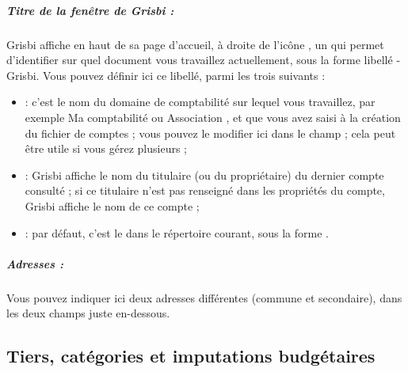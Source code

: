 \subparagraph{Titre de la fenêtre de Grisbi :\label{setup-display-addresses-titles}}

Grisbi affiche en haut de sa page d'accueil, à droite de l'icône , un  qui permet d'identifier sur quel document vous travaillez actuellement, sous la forme \og libellé - Grisbi\fg{}. Vous pouvez définir ici ce libellé, parmi les trois suivants :

\begin{itemize}
	\item {} : c'est le nom du domaine de comptabilité sur lequel vous travaillez, par exemple \og Ma comptabilité \fg{} ou \og Association \fg{}, et que vous avez saisi à la création du fichier de comptes ; vous pouvez le modifier ici dans le champ  ; cela peut être utile si vous gérez plusieurs  ;
	\item {} : Grisbi affiche le nom du titulaire (ou du propriétaire) du dernier compte consulté ; si ce titulaire n'est pas renseigné dans les propriétés du compte, Grisbi affiche le nom de ce compte ;
	\item {} : par défaut, c'est le  dans le répertoire courant, sous la forme 	.
\end{itemize}


\subparagraph{Adresses :\label{setup-display-addresses-address}}

Vous pouvez indiquer ici deux adresses différentes (commune et secondaire), dans les deux champs juste en-dessous.


\subsection{Tiers, catégories et imputations budgétaires\label{setup-display-third}}

